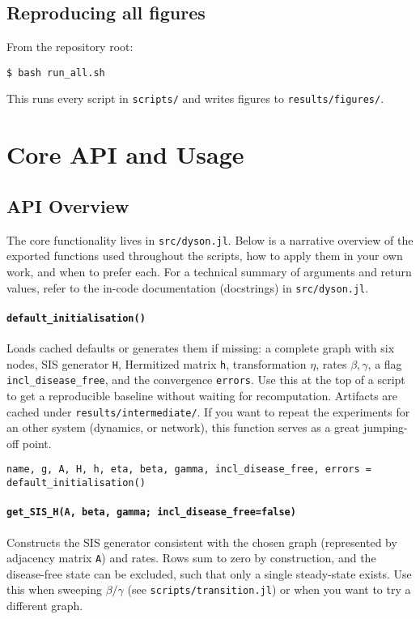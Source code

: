 \documentclass[11pt]{article}
\newcommand{\code}[1]{\texttt{#1}}
\begin{document}
\subsection{Reproducing all figures}
From the repository root:
\begin{Verbatim}[fontsize=\small]
$ bash run_all.sh
\end{Verbatim}
This runs every script in \code{scripts/} and writes figures to \code{results/figures/}.

\section{Core API and Usage}
\subsection{API Overview}
The core functionality lives in \code{src/dyson.jl}.
Below is a narrative overview of the exported functions used throughout the scripts, how to apply them in your own work, and when to prefer each.
For a technical summary of arguments and return values, refer to the in-code documentation (docstrings) in \code{src/dyson.jl}.

\paragraph{\code{default\_initialisation()}} Loads cached defaults or generates them if missing: a complete graph with six nodes, SIS generator \code{H}, Hermitized matrix \code{h}, transformation \(\eta\), rates \(\beta,\gamma\), a flag \code{incl\_disease\_free}, and the convergence \code{errors}.
Use this at the top of a script to get a reproducible baseline without waiting for recomputation. Artifacts are cached under \code{results/intermediate/}.
If you want to repeat the experiments for an other system (dynamics, or network), this function serves as a great jumping-off point.

\begin{Verbatim}[fontsize=\small]
name, g, A, H, h, eta, beta, gamma, incl_disease_free, errors = default_initialisation()
\end{Verbatim}

\paragraph{\code{get\_SIS\_H(A, beta, gamma; incl\_disease\_free=false)}} Constructs the SIS generator consistent with the chosen graph (represented by adjacency matrix \code{A}) and rates.
Rows sum to zero by construction, and the disease-free state can be excluded, such that only a single steady-state exists.
Use this when sweeping \(\beta/\gamma\) (see \code{scripts/transition.jl}) or when you want to try a different graph.
\end{document}
